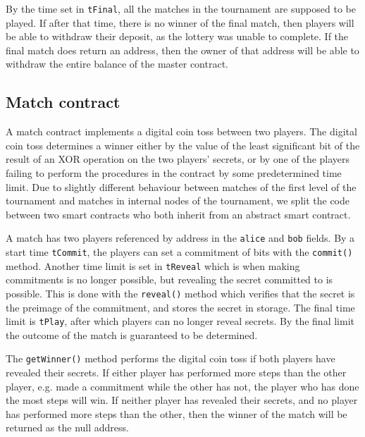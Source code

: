 By the time set in \texttt{tFinal}, all the matches in the tournament are supposed to be played. If after that time, there is no winner of the final match, then players will be able to withdraw their deposit, as the lottery was unable to complete. If the final match does return an address, then the owner of that address will be able to withdraw the entire balance of the master contract.



\subsection{Match contract}
A match contract implements a digital coin toss between two players. The digital coin toss determines a winner either by the value of the least significant bit of the result of an XOR operation on the two players' secrets, or by one of the players failing to perform the procedures in the contract by some predetermined time limit.
Due to slightly different behaviour between matches of the first level of the tournament and matches in internal nodes of the tournament, we split the code between two smart contracts who both inherit from an abstract smart contract.

A match has two players referenced by address in the \texttt{alice} and \texttt{bob} fields. By a start time \texttt{tCommit}, the players can set a commitment of bits with the \texttt{commit()} method. Another time limit is set in \texttt{tReveal} which is when making commitments is no longer possible, but revealing the secret committed to is possible. This is done with the \texttt{reveal()} method which verifies that the secret is the preimage of the commitment, and stores the secret in storage. The final time limit is \texttt{tPlay}, after which players can no longer reveal secrets. By the final limit the outcome of the match is guaranteed to be determined. 

The \texttt{getWinner()} method performs the digital coin toss if both players have revealed their secrets. If either player has performed more steps than the other player, e.g. made a commitment while the other has not, the player who has done the most steps will win. If neither player has revealed their secrets, and no player has performed more steps than the other, then the winner of the match will be returned as the null address.

